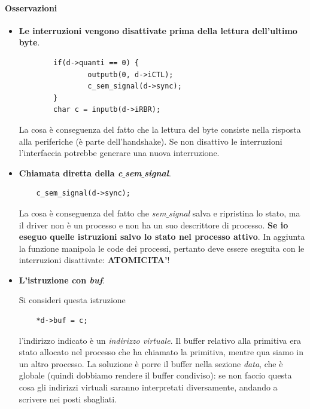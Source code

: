 \documentclass[11pt]{report}
\theoremstyle{definition}
\begin{document}
\paragraph{Osservazioni} 
\begin{itemize}
	\item \textbf{Le interruzioni vengono disattivate prima della lettura dell'ultimo byte}.
	\small
	\begin{verbatim}
		if(d->quanti == 0) {
			    outputb(0, d->iCTL);
			    c_sem_signal(d->sync);    
		}
		char c = inputb(d->iRBR);
	\end{verbatim}
	\normalsize
	La cosa è conseguenza del fatto che la lettura del byte consiste nella risposta alla periferiche (è parte dell'handshake). Se non disattivo le interruzioni l'interfaccia potrebbe generare una nuova interruzione.
	
	\item \textbf{Chiamata diretta della \emph{c$\_$sem$\_$signal}}.
	\small
	\begin{verbatim}
	c_sem_signal(d->sync);    
	\end{verbatim}
	\normalsize
	La cosa è conseguenza del fatto che \emph{sem$\_$signal} salva e ripristina lo stato, ma il driver non è un processo e non ha un suo descrittore di processo. \textbf{Se io eseguo quelle istruzioni salvo lo stato nel processo attivo}. In aggiunta la funzione manipola le code dei processi, pertanto deve essere eseguita con le interruzioni disattivate: \textbf{ATOMICITA'}!
	
	\item \textbf{L'istruzione con \emph{buf}}.
	
	Si consideri questa istruzione
	\begin{verbatim}
	*d->buf = c;
	\end{verbatim}
	l'indirizzo indicato è un \emph{indirizzo virtuale}. Il buffer relativo alla primitiva era stato allocato nel processo che ha chiamato la primitiva, mentre qua siamo in un altro processo. La soluzione è porre il buffer nella sezione \emph{data}, che è globale (quindi dobbiamo rendere il buffer condiviso): se non faccio questa cosa gli indirizzi virtuali saranno interpretati diversamente, andando a scrivere nei posti sbagliati. 
\end{itemize}	
\end{document}
